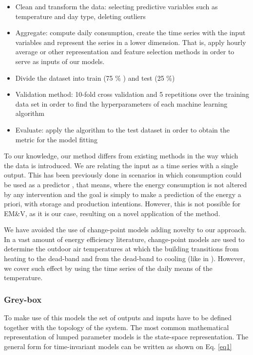 \documentclass[10pt, conference, compsocconf]{IEEEtran}
\begin{document}
\begin{itemize}
\item Clean and transform the data: selecting predictive variables such as temperature and day type, deleting outliers 
\item Aggregate: compute daily consumption, create the time series with the input variables and represent the series in a lower dimension. That is, apply hourly average or other representation and feature selection methods in order to serve as inputs of our models.
\item Divide the dataset into train (75 \% ) and test (25 \%)
\item Validation method: 10-fold cross validation and 5 repetitions over the training data set in order to find the hyperparameters of each machine learning algorithm
\item Evaluate: apply the algorithm to the test dataset in order to obtain the metric for the model fitting
\end{itemize}


To our knowledge, our method differs from existing methods in the way which the data is introduced. We are relating the input as a time series with a single output. This has been previously done in scenarios in which consumption could be used as a predictor \cite{ruijin2013building}, that means, where the energy consumption is not altered by any intervention and the goal is simply to make a prediction of the energy a priori, with storage and production intentions. However, this is not possible for EM\&V, as it is our case, resulting on a novel application of the method.

We have avoided the use of change-point models adding novelty to our approach. In a vast amount of energy efficiency literature, change-point models are used to determine the outdoor air temperatures at which the building transitions from heating to the dead-band and from the dead-band to cooling (like in \cite{kissock1998ambient}). However, we cover such effect by using the time series of the  daily means of the temperature. 


\subsubsection{ Grey-box}


To make use of this models the set of outputs and inputs have to be defined together with the topology of the system. 
The most common mathematical representation of lumped parameter models is the state-space representation. The general form for time-invariant models can be written as shown on Eq. \ref{eq1}
\end{document}
